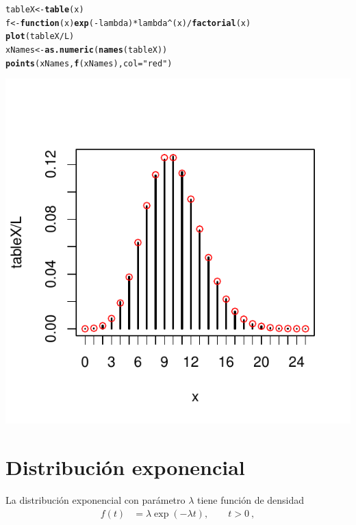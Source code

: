 \documentclass[12pt,reqno]{amsart}\usepackage[]{graphicx}\usepackage[]{color}
\makeatletter
\newcommand{\hlstr}[1]{\textcolor[rgb]{0.192,0.494,0.8}{#1}}%
\newcommand{\hlopt}[1]{\textcolor[rgb]{0,0,0}{#1}}%
\newcommand{\hlstd}[1]{\textcolor[rgb]{0.345,0.345,0.345}{#1}}%
\newcommand{\hlkwa}[1]{\textcolor[rgb]{0.161,0.373,0.58}{\textbf{#1}}}%
\newcommand{\hlkwb}[1]{\textcolor[rgb]{0.69,0.353,0.396}{#1}}%
\newcommand{\hlkwc}[1]{\textcolor[rgb]{0.333,0.667,0.333}{#1}}%
\newcommand{\hlkwd}[1]{\textcolor[rgb]{0.737,0.353,0.396}{\textbf{#1}}}%
\newenvironment{kframe}{%
 \def\at@end@of@kframe{}%
 \ifinner\ifhmode%
  \def\at@end@of@kframe{\end{minipage}}%
  \begin{minipage}{\columnwidth}%
 \fi\fi%
 \def\FrameCommand##1{\hskip\@totalleftmargin \hskip-\fboxsep
 \colorbox{shadecolor}{##1}\hskip-\fboxsep
     \hskip-\linewidth \hskip-\@totalleftmargin \hskip\columnwidth}%
 \MakeFramed {\advance\hsize-\width
   \@totalleftmargin\z@ \linewidth\hsize
   \@setminipage}}%
 {\par\unskip\endMakeFramed%
 \at@end@of@kframe}
\newenvironment{knitrout}{}{} %
\makeatother
\begin{document}
\begin{knitrout}
\color{fgcolor}\begin{kframe}
\begin{alltt}
\hlstd{tableX} \hlkwb{<-} \hlkwd{table}\hlstd{(x)}
\hlstd{f} \hlkwb{<-} \hlkwa{function}\hlstd{(}\hlkwc{x}\hlstd{)} \hlkwd{exp}\hlstd{(}\hlopt{-}\hlstd{lambda)}\hlopt{*}\hlstd{lambda}\hlopt{^}\hlstd{(x)}\hlopt{/}\hlkwd{factorial}\hlstd{(x)}
\hlkwd{plot}\hlstd{(tableX}\hlopt{/}\hlstd{L)}
\hlstd{xNames} \hlkwb{<-} \hlkwd{as.numeric}\hlstd{(}\hlkwd{names}\hlstd{(tableX))}
\hlkwd{points}\hlstd{( xNames ,} \hlkwd{f}\hlstd{(xNames) ,} \hlkwc{col} \hlstd{=} \hlstr{"red"}\hlstd{)}
\end{alltt}
\end{kframe}
\includegraphics[width=.60\linewidth]{figure/histPoisson_} 

\end{knitrout}



\section{Distribución exponencial}
La distribución exponencial con parámetro $\lambda$ tiene función de densidad
\begin{equation}\label{dexp}
  \begin{split}
  f(t)&= \lambda \exp(-\lambda t),\qquad t > 0 \:,
  \end{split}
\end{equation}
\end{document}
